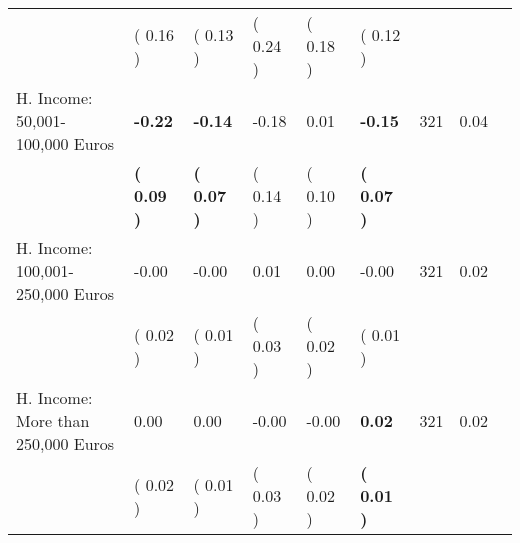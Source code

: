 \begin{tabular}{L{6.2cm} C{1.8cm} C{1.8cm} C{1.8cm} C{1.8cm} C{1.8cm} C{1.8cm} C{0.3cm} C{0.3cm}}
 & (     0.16 ) & (     0.13 ) & (     0.24 ) & (     0.18 ) & (     0.12 )  & \\
H. Income: 50,001-100,000 Euros & \textbf{    -0.22} & \textbf{    -0.14} &     -0.18 &      0.01 & \textbf{    -0.15}  & 321 &       0.04 \\ 
 & \textbf{(     0.09 )} & \textbf{(     0.07 )} & (     0.14 ) & (     0.10 ) & \textbf{(     0.07 )}  & \\
H. Income: 100,001-250,000 Euros &     -0.00 &     -0.00 &      0.01 &      0.00 &     -0.00  & 321 &       0.02 \\ 
 & (     0.02 ) & (     0.01 ) & (     0.03 ) & (     0.02 ) & (     0.01 )  & \\
H. Income: More than 250,000 Euros &      0.00 &      0.00 &     -0.00 &     -0.00 & \textbf{     0.02}  & 321 &       0.02 \\ 
 & (     0.02 ) & (     0.01 ) & (     0.03 ) & (     0.02 ) & \textbf{(     0.01 )}  & \\
\bottomrule
\end{tabular}
